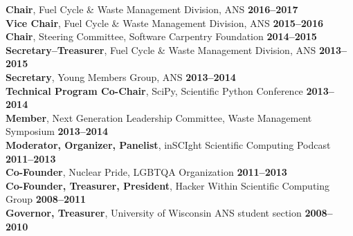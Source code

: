 \documentclass[margin,line]{resume}
\begin{document}
\begin{resume}
                \textbf{Chair}, Fuel Cycle \& Waste Management Division, ANS  \hfill \textbf{2016--2017}\vspace{.5mm}\\%
                \textbf{Vice Chair}, Fuel Cycle \& Waste Management Division, ANS  \hfill \textbf{2015--2016}\vspace{.5mm}\\%
                \textbf{Chair}, Steering Committee, Software Carpentry Foundation   \hfill \textbf{2014--2015}\vspace{.5mm}\\%
                \textbf{Secretary--Treasurer}, Fuel Cycle \& Waste Management Division, ANS  \hfill \textbf{2013--2015}\vspace{.5mm}\\%
                \textbf{Secretary}, Young Members Group, ANS  \hfill \textbf{2013--2014}\vspace{.5mm}\\%
                \textbf{Technical Program Co-Chair}, SciPy, Scientific Python Conference   \hfill \textbf{2013--2014}\vspace{.5mm}\\%
                \textbf{Member}, Next Generation Leadership Committee, Waste Management Symposium  \hfill \textbf{2013--2014}\vspace{.5mm}\\%
                \textbf{Moderator, Organizer, Panelist}, inSCIght Scientific Computing Podcast  \hfill \textbf{2011--2013}\vspace{.5mm}\\%
                \textbf{Co-Founder}, Nuclear Pride, LGBTQA Organization  \hfill \textbf{2011--2013}\vspace{.5mm}\\%
                \textbf{Co-Founder, Treasurer, President}, Hacker Within Scientific Computing Group  \hfill \textbf{2008--2011}\vspace{.5mm}\\%
                \textbf{Governor, Treasurer}, University of Wisconsin ANS student section  \hfill \textbf{2008--2010}\vspace{.5mm}%

\end{resume}
\end{document}
